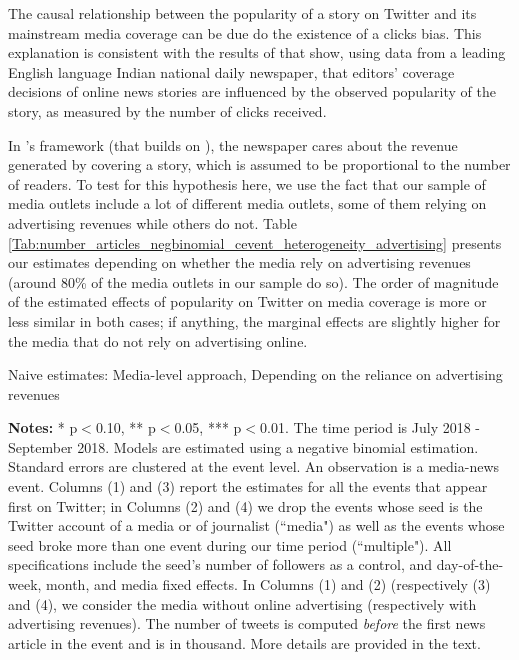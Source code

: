 The causal relationship between the popularity of a story on Twitter and its mainstream media coverage can be due do the existence of a clicks bias. This explanation is consistent with the results of \citet{SenYildirim2015} that show, using data from a leading English language Indian national daily newspaper, that editors' coverage decisions of online news stories are influenced by the observed popularity of the story, as measured by the number of clicks received.

In \citet{SenYildirim2015}'s framework (that builds on \citet{Latham2015}), the newspaper cares about the revenue generated by covering a story, which is assumed to be proportional to the number of readers. To test for this hypothesis here, we use the fact that our sample of media outlets include a lot of different media outlets, some of them relying on advertising revenues while others do not. Table \ref{Tab:number_articles_negbinomial_cevent_heterogeneity_advertising} presents our estimates depending on whether the media rely on advertising revenues (around 80\% of the media outlets in our sample do so). The order of magnitude of the estimated effects of popularity on Twitter on media coverage is more or less similar in both cases; if anything, the marginal effects are slightly higher for the media that do not rely on advertising online.


\begin{table}
\caption{Naive estimates: Media-level approach, Depending on the reliance on advertising revenues}
\begin{center}
	
\end{center}
\begin{spacing}{0.5}
	{\fns \textbf{Notes:} * p$<$0.10, ** p$<$0.05, *** p$<$0.01. The time period is July 2018 - September 2018. Models are estimated using a negative binomial estimation. Standard errors are clustered at the event level. An observation is a media-news event.  Columns (1) and (3) report the estimates for all the events that appear first on Twitter; in Columns (2) and (4)  we drop the events whose seed is the Twitter account of a media or of journalist (``media") as well as the events whose seed broke more than one event during our time period (``multiple"). All specifications include the seed's number of followers as a control, and day-of-the-week, month, and media fixed effects. In Columns (1) and (2) (respectively (3) and (4), we consider the media without online advertising (respectively with advertising revenues). The number of tweets is computed \textit{before} the first news article in the event and is in thousand. More details are provided in the text.} 
\end{spacing}
\label{Tab:number_articles_negbinomial_cevent_heterogeneity_advertising}
\end{table} 


